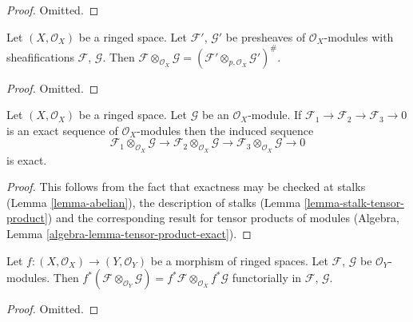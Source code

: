 \begin{proof}
Omitted.
\end{proof}

\begin{lemma}
\label{lemma-tensor-product-sheafification}
Let $(X, \mathcal{O}_X)$ be a ringed space.
Let $\mathcal{F}'$, $\mathcal{G}'$ be presheaves of $\mathcal{O}_X$-modules
with sheafifications $\mathcal{F}$, $\mathcal{G}$. Then
$\mathcal{F} \otimes_{\mathcal{O}_X} \mathcal{G} =
(\mathcal{F}' \otimes_{p, \mathcal{O}_X} \mathcal{G}')^\#$.
\end{lemma}

\begin{proof}
Omitted.
\end{proof}


\begin{lemma}
\label{lemma-tensor-product-exact}
Let $(X, \mathcal{O}_X)$ be a ringed space.
Let $\mathcal{G}$ be an $\mathcal{O}_X$-module.
If
$\mathcal{F}_1
\to \mathcal{F}_2
\to \mathcal{F}_3
\to 0$
is an exact sequence of $\mathcal{O}_X$-modules then
the induced sequence
$$
\mathcal{F}_1 \otimes_{\mathcal{O}_X} \mathcal{G} \to
\mathcal{F}_2 \otimes_{\mathcal{O}_X} \mathcal{G} \to
\mathcal{F}_3 \otimes_{\mathcal{O}_X} \mathcal{G} \to
0
$$
is exact.
\end{lemma}

\begin{proof}
This follows from the fact that exactness may be checked at stalks
(Lemma \ref{lemma-abelian}), the description of stalks
(Lemma \ref{lemma-stalk-tensor-product}) and the corresponding
result for tensor products of modules
(Algebra, Lemma \ref{algebra-lemma-tensor-product-exact}).
\end{proof}

\begin{lemma}
\label{lemma-tensor-product-pullback}
Let $f : (X, \mathcal{O}_X) \to (Y, \mathcal{O}_Y)$ be
a morphism of ringed spaces. Let $\mathcal{F}$, $\mathcal{G}$
be $\mathcal{O}_Y$-modules. Then
$f^*(\mathcal{F} \otimes_{\mathcal{O}_Y} \mathcal{G})
= f^*\mathcal{F} \otimes_{\mathcal{O}_X} f^*\mathcal{G}$
functorially in $\mathcal{F}$, $\mathcal{G}$.
\end{lemma}

\begin{proof}
Omitted.
\end{proof}

